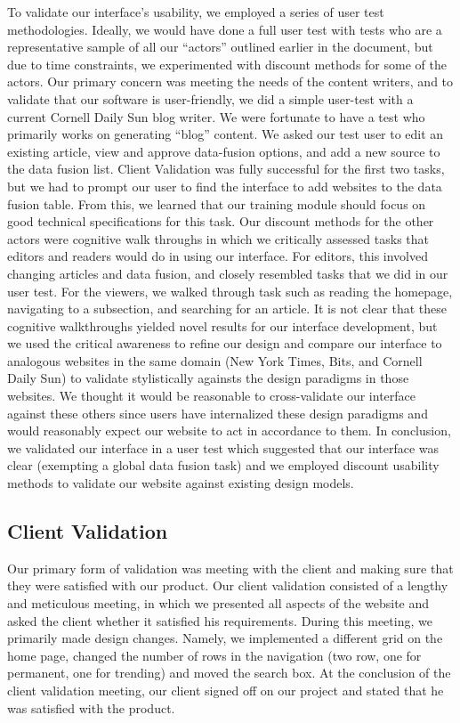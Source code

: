 \documentclass[10pt]{article} %
\begin{document}
To validate our interface’s usability, we employed a series of user test methodologies. Ideally, we would have done a full user test with tests who are a representative sample of all our “actors” outlined earlier in the document, but due to time constraints, we experimented with discount methods for some of the actors. Our primary concern was meeting the needs of the content writers, and to validate that our software is user-friendly, we did a simple user-test with a current Cornell Daily Sun blog writer. We were fortunate to have a test who primarily works on generating “blog” content. We asked our test user to edit an existing article, view and approve data-fusion options, and add a new source to the data fusion list. Client Validation was fully successful for the first two tasks, but we had to prompt our user to find the interface to add websites to the data fusion table. From this, we learned that our training module should focus on good technical specifications for this task. Our discount methods for the other actors were cognitive walk throughs in which we critically assessed tasks that editors and readers would do in using our interface. For editors, this involved changing articles and data fusion, and closely resembled tasks that we did in our user test. For the viewers, we walked through task such as reading the homepage, navigating to a subsection, and searching for an article. It is not clear that these cognitive walkthroughs yielded novel results for our interface development, but we used the critical awareness to refine our design and compare our interface to analogous websites in the same domain (New York Times, Bits, and Cornell Daily Sun) to validate stylistically againsts the design paradigms in those websites. We thought it would be reasonable to cross-validate our interface against these others since users have internalized these design paradigms and would reasonably expect our website to act in accordance to them. In conclusion, we validated our interface in a user test which suggested that our interface was clear (exempting a global data fusion task) and we employed discount usability methods to validate our website against existing design models.

\subsection{Client Validation}

Our primary form of validation was meeting with the client and making sure that they were satisfied with our product. Our client validation consisted of a lengthy and meticulous meeting, in which we presented all aspects of the website and asked the client whether it satisfied his requirements. During this meeting, we primarily made design changes. Namely, we implemented a different grid on the home page, changed the number of rows in the navigation (two row, one for permanent, one for trending) and moved the search box. At the conclusion of the client validation meeting, our client signed off on our project and stated that he was satisfied with the product. 
\end{document}
